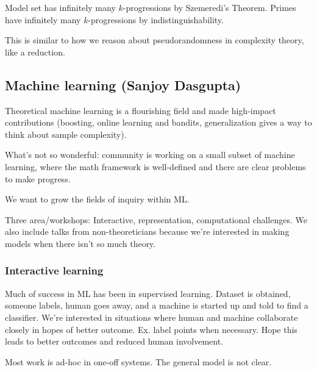 Model set has infinitely many $k$-progressions by Szemeredi's Theorem. Primes have infinitely many $k$-progressions by indistinguishability.

This is similar to how we reason about pseudorandomness in complexity theory, like a reduction.

\subsection{Machine learning (Sanjoy Dasgupta)}

Theoretical machine learning is a flourishing field and made high-impact contributions (boosting, online learning and bandits, generalization gives a way to think about sample complexity).

What's not so wonderful: community is working on a small subset of machine learning, where the math framework is well-defined and there are clear problems to make progress.

We want to grow the fields of inquiry within ML.

Three area/workshops: Interactive, representation, computational challenges. We also include talks from non-theoreticians because we're interested in making models when there isn't so much theory.

\subsubsection{Interactive learning}

Much of success in ML has been in supervised learning. Dataset is obtained, someone labels, human goes away, and a machine is started up and told to find a classifier. We're interested in situations where human and machine collaborate closely in hopes of better outcome. Ex. label points when necessary.
Hope this leads to better outcomes and reduced human involvement.

Most work is ad-hoc in one-off systems. The general model is not clear.

